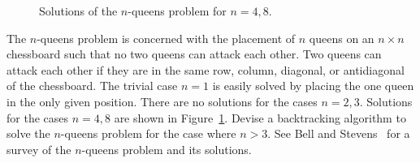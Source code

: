 \begin{problem}
\begin{figure}[!htbp]
\centering
{}
\quad
{}
\caption{Solutions of the $n$-queens problem for $n = 4, 8$.}
\label{fig:graph_algorithms:n_queens_solutions}
\end{figure}

\item The $n$-queens
  problem is concerned with the placement of $n$ queens on an
  $n \times n$ chessboard such that no two queens can
  attack each other. Two queens can attack each other if they are in
  the same row, column, diagonal, or antidiagonal of the
  chessboard. The trivial case $n = 1$ is easily solved by placing the
  one queen in the only given position. There are no solutions for the
  cases $n = 2, 3$. Solutions for the cases $n = 4, 8$ are shown in
  Figure~\ref{fig:graph_algorithms:n_queens_solutions}. Devise a
  backtracking algorithm to solve the
  $n$-queens problem for the case where $n > 3$. See
  Bell and
  Stevens~\cite{BellStevens2009} for a survey of
  the $n$-queens problem and its solutions.


\end{problem}
